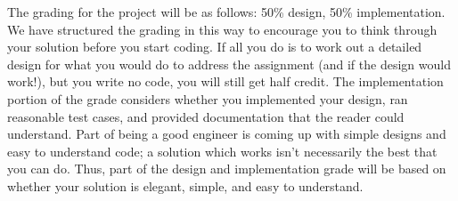The grading for the project will be as follows: 50\% design, 50\%
implementation. We have structured the grading in this way
to encourage you to think through your solution before you start
coding.   If all you do is to work out a detailed design for what
you would do to address the assignment (and if the design would work!), but
you write no code, you will still get half credit.  The implementation portion
of the grade considers whether you implemented your design, ran reasonable
test cases, and provided documentation that the reader could understand.
Part of being a good engineer is coming up with simple designs and easy
to understand code; a solution which works isn't necessarily the best that
you can do.  Thus, part of the design and implementation grade
will be based on whether your solution is elegant, simple, and
easy to understand.

